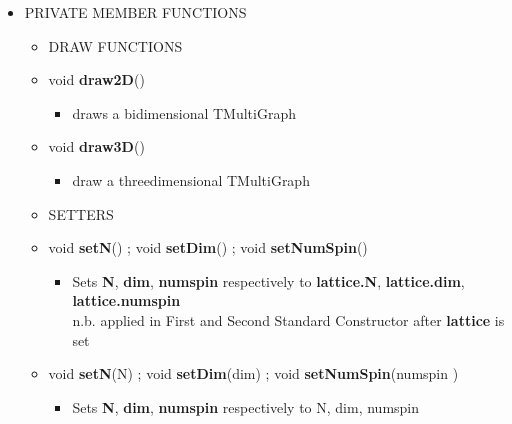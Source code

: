\begin{itemize}
	\item[] PRIVATE MEMBER FUNCTIONS \\ 
	\begin{itemize}
			
		\item[] DRAW FUNCTIONS
			\item[] void \textbf{draw2D}()		 
			\begin{itemize}
				\item[] draws a bidimensional TMultiGraph
			\end{itemize}
			
			\item[] void \textbf{draw3D}()  		 
			\begin{itemize}
				\item[] draw a threedimensional TMultiGraph
			\end{itemize}
			
		\item[] SETTERS
			
			\item[] void \textbf{setN}() ; void \textbf{setDim}() ; void \textbf{setNumSpin}()				
			\begin{itemize}
				\item[]
						{\small
						 Sets \textbf{N}, \textbf{dim}, \textbf{num\textunderscore spin} respectively to 
						\textbf{lattice.N}, \textbf{lattice.dim}, \textbf{lattice.num\textunderscore spin} 
						\\
						\textsf{n.b.}
						applied in First and Second Standard Constructor after \textbf{lattice} is set 
						}
			\end{itemize}
			
			\item[] void \textbf{setN}(\textunderscore N) ;
					void \textbf{setDim}(\textunderscore dim) ;
					void \textbf{setNumSpin}(\textunderscore num\textunderscore spin ) 	
			\begin{itemize}
				\item[] Sets \textbf{N}, \textbf{dim}, \textbf{num\textunderscore spin} respectively to 
						\textunderscore N, \textunderscore dim, \textunderscore num\textunderscore spin
			\end{itemize}	
				
	\end{itemize}

	
\end{itemize}





